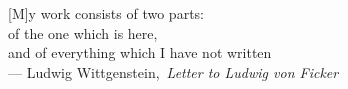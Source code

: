 
\thispagestyle{empty}


\vspace*{3cm}

\begin{center}
    [M]y work consists of two parts: \\
    of the one which is here,\\
    and of everything which I have not written\\
    --- Ludwig Wittgenstein,\, \emph{Letter to Ludwig von
    Ficker}~\cite{Luckhart:1979}    
\end{center}

\bigskip
